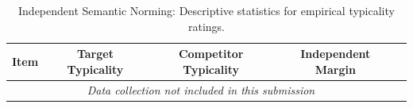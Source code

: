 \begin{table}[htbp]
\centering
\caption{Independent Semantic Norming: Descriptive statistics for empirical typicality ratings.}
\label{tab:independent-norming}
\begin{tabular}{lcccc}
\toprule
Item & Target Typicality & Competitor Typicality & Independent Margin \\
\midrule
\multicolumn{4}{c}{\textit{Data collection not included in this submission}} \\
\bottomrule
\end{tabular}
\end{table}
